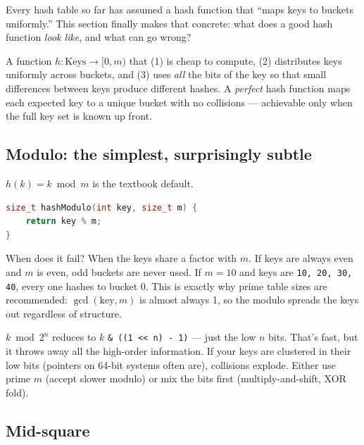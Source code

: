 \documentclass[11pt]{article}
\begin{document}
Every hash table so far has assumed a hash function that ``maps
keys to buckets uniformly.'' This section finally makes that
concrete: what does a good hash function \emph{look like}, and
what can go wrong?

\begin{defnbox}
A function $h: \text{Keys} \to [0, m)$ that (1) is cheap to
compute, (2) distributes keys uniformly across buckets, and (3)
uses \emph{all} the bits of the key so that small differences
between keys produce different hashes. A \emph{perfect} hash
function maps each expected key to a unique bucket with no
collisions --- achievable only when the full key set is known
up front.
\end{defnbox}

\subsection*{Modulo: the simplest, surprisingly subtle}

$h(k) = k \bmod m$ is the textbook default.

\begin{examplebox}
\begin{lstlisting}[language=C++,basicstyle=\ttfamily\small,frame=single]
size_t hashModulo(int key, size_t m) {
    return key % m;
}
\end{lstlisting}
\end{examplebox}

When does it fail? When the keys share a factor with $m$. If
keys are always even and $m$ is even, odd buckets are never
used. If $m = 10$ and keys are \texttt{10, 20, 30, 40}, every
one hashes to bucket 0. This is exactly why prime table sizes
are recommended: $\gcd(\text{key}, m)$ is almost always 1, so
the modulo spreads the keys out regardless of structure.

\begin{warnbox}
$k \bmod 2^n$ reduces to $k$ \texttt{\& ((1 << n) - 1)} --- just
the low $n$ bits. That's fast, but it throws away all the
high-order information. If your keys are clustered in their low
bits (pointers on 64-bit systems often are), collisions explode.
Either use prime $m$ (accept slower modulo) or mix the bits
first (multiply-and-shift, XOR fold).
\end{warnbox}

\subsection*{Mid-square}
\end{document}
